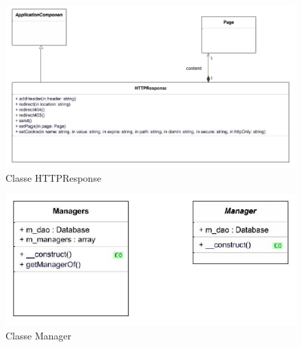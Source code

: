     \begin{figure}[h]
        \begin{center}
            \includegraphics[angle=90, scale=0.8]{images/uml/classes/HTTPResponse.png} 
        \end{center}

        \caption{Classe HTTPResponse}
        \label{Classe HTTPResponse}
    \end{figure}


    \begin{figure}[h]
        \begin{center}
            \includegraphics[scale=1.0]{images/uml/classes/Manager.png} 
        \end{center}

        \caption{Classe Manager}
        \label{Classe Manager}
    \end{figure}


